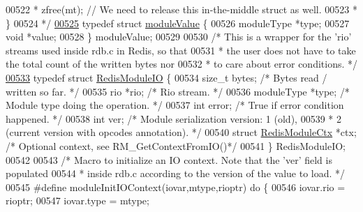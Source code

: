 \begin{DoxyCode}
{{{{{{00522 \textcolor{comment}{ *      zfree(mt); // We need to release this in-the-middle struct as well.}
00523 \textcolor{comment}{ *  \}}
00524 \textcolor{comment}{ */}
\hyperlink{structmoduleValue}{00525} \textcolor{keyword}{typedef} \textcolor{keyword}{struct} \hyperlink{structmoduleValue}{moduleValue} \{
00526     moduleType *type;
00527     \textcolor{keywordtype}{void} *value;
00528 \} moduleValue;
00529 
00530 \textcolor{comment}{/* This is a wrapper for the 'rio' streams used inside rdb.c in Redis, so that}
00531 \textcolor{comment}{ * the user does not have to take the total count of the written bytes nor}
00532 \textcolor{comment}{ * to care about error conditions. */}
\hyperlink{structRedisModuleIO}{00533} \textcolor{keyword}{typedef} \textcolor{keyword}{struct} \hyperlink{structRedisModuleIO}{RedisModuleIO} \{
00534     size\_t bytes;       \textcolor{comment}{/* Bytes read / written so far. */}
00535     rio *rio;           \textcolor{comment}{/* Rio stream. */}
00536     moduleType *type;   \textcolor{comment}{/* Module type doing the operation. */}
00537     \textcolor{keywordtype}{int} error;          \textcolor{comment}{/* True if error condition happened. */}
00538     \textcolor{keywordtype}{int} ver;            \textcolor{comment}{/* Module serialization version: 1 (old),}
00539 \textcolor{comment}{                         * 2 (current version with opcodes annotation). */}
00540     \textcolor{keyword}{struct} \hyperlink{structRedisModuleCtx}{RedisModuleCtx} *ctx; \textcolor{comment}{/* Optional context, see RM\_GetContextFromIO()*/}
00541 \} RedisModuleIO;
00542 
00543 \textcolor{comment}{/* Macro to initialize an IO context. Note that the 'ver' field is populated}
00544 \textcolor{comment}{ * inside rdb.c according to the version of the value to load. */}
00545 \textcolor{preprocessor}{#}\textcolor{preprocessor}{define} \textcolor{preprocessor}{moduleInitIOContext}\textcolor{preprocessor}{(}\textcolor{preprocessor}{iovar}\textcolor{preprocessor}{,}\textcolor{preprocessor}{mtype}\textcolor{preprocessor}{,}\textcolor{preprocessor}{rioptr}\textcolor{preprocessor}{)} \textcolor{keywordflow}{do} \textcolor{preprocessor}{\{}
00546     \textcolor{preprocessor}{iovar}\textcolor{preprocessor}{.}\textcolor{preprocessor}{rio} \textcolor{preprocessor}{=} \textcolor{preprocessor}{rioptr}\textcolor{preprocessor}{;}
00547     \textcolor{preprocessor}{iovar}\textcolor{preprocessor}{.}\textcolor{preprocessor}{type} \textcolor{preprocessor}{=} \textcolor{preprocessor}{mtype}\textcolor{preprocessor}{;}
}}}}}}
\end{DoxyCode}

